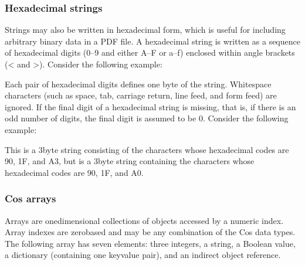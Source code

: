 \documentclass[letterpaper,12pt,english,openany,oneside]{sphinxmanual}
\begin{document}
\subsubsection{Hexadecimal strings}
\label{\detokenize{Plugins_Cos:hexadecimal-strings}}
Strings may also be written in hexadecimal form, which is useful for including arbitrary binary data in a PDF file. A hexadecimal string is written as a sequence of hexadecimal digits (0–9 and either A–F or a–f) enclosed within angle brackets (< and >). Consider the following example:

\begin{sphinxVerbatim}[commandchars=\\\{\}]
 
\end{sphinxVerbatim}

Each pair of hexadecimal digits defines one byte of the string. White\sphinxhyphen{}space characters (such as space, tab, carriage return, line feed, and form feed) are ignored. If the final digit of a hexadecimal string is missing, that is, if there is an odd number of digits, the final digit is assumed to be 0. Consider the following example:

\begin{sphinxVerbatim}[commandchars=\\\{\}]
\end{sphinxVerbatim}

This is a 3\sphinxhyphen{}byte string consisting of the characters whose hexadecimal codes are 90, 1F, and A3, but  is a 3\sphinxhyphen{}byte string containing the characters whose hexadecimal codes are 90, 1F, and A0.


\subsubsection{Cos arrays}
\label{\detokenize{Plugins_Cos:cos-arrays}}
Arrays are one\sphinxhyphen{}dimensional collections of objects accessed by a numeric index. Array indexes are zero\sphinxhyphen{}based and may be any combination of the Cos data types. The following array has seven elements: three integers, a string, a Boolean value, a dictionary (containing one key\sphinxhyphen{}value pair), and an indirect object reference.

\begin{sphinxVerbatim}[commandchars=\\\{\}]
\PYG{p}{[}                 \PYG{p}{]}
\end{sphinxVerbatim}
\end{document}
